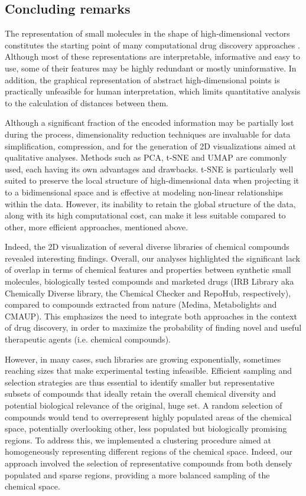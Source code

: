 \subsection{Concluding remarks}


The representation of small molecules in the shape of high-dimensional vectors constitutes the starting point of many computational drug discovery approaches \cite{cereto-massague_molecular_2015}. Although most of these representations are interpretable, informative and easy to use, some of their features may be highly redundant or mostly uninformative. In addition, the graphical representation of abstract high-dimensional points is practically unfeasible for human interpretation, which limits quantitative analysis to the calculation of distances between them.

Although a significant fraction of the encoded information may be partially lost during the process, dimensionality reduction techniques are invaluable for data simplification, compression, and for the generation of 2D visualizations aimed at qualitative analyses. Methods such as PCA, t-SNE and UMAP are commonly used, each having its own advantages and drawbacks. t-SNE is particularly well suited to preserve the local structure of high-dimensional data when projecting it to a bidimensional space and is effective at modeling non-linear relationships within the data. However, its inability to retain the global structure of the data, along with its high computational cost, can make it less suitable compared to other, more efficient approaches, mentioned above.

Indeed, the 2D visualization of several diverse libraries of chemical compounds revealed interesting findings. Overall, our analyses highlighted the significant lack of overlap in terms of chemical features and properties between synthetic small molecules, biologically tested compounds and marketed drugs (IRB Library aka Chemically Diverse library, the Chemical Checker and RepoHub, respectively), compared to compounds extracted from nature (Medina, Metabolights and CMAUP). This emphasizes the need to integrate both approaches in the context of drug discovery, in order to maximize the probability of finding novel and useful therapeutic agents (i.e. chemical compounds).

However, in many cases, such libraries are growing exponentially, sometimes reaching sizes that make experimental testing infeasible. Efficient sampling and selection strategies are thus essential to identify smaller but representative subsets of compounds that ideally retain the overall chemical diversity and potential biological relevance of the original, huge set. A random selection of compounds would tend to overrepresent highly populated areas of the chemical space, potentially overlooking other, less populated but biologically promising regions. To address this, we implemented a clustering procedure aimed at homogeneously representing different regions of the chemical space. Indeed, our approach involved the selection of representative compounds from both densely populated and sparse regions, providing a more balanced sampling of the chemical space.

